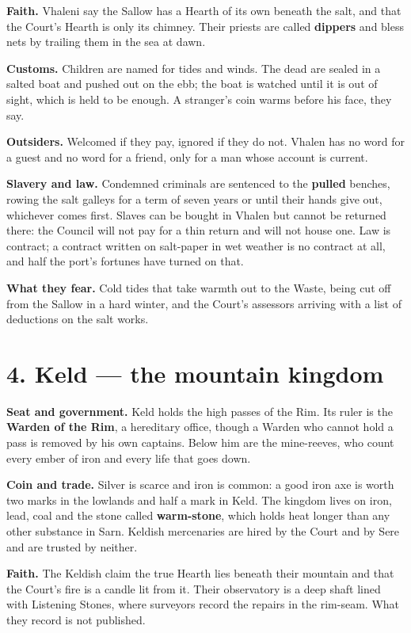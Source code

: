 \documentclass{design/chronicle}
\begin{document}
\textbf{Faith.} Vhaleni say the Sallow has a Hearth of its own beneath the salt, and that the Court’s Hearth is only its chimney. Their priests are called \textbf{dippers} and bless nets by trailing them in the sea at dawn.

\textbf{Customs.} Children are named for tides and winds. The dead are sealed in a salted boat and pushed out on the ebb; the boat is watched until it is out of sight, which is held to be enough. A stranger’s coin warms before his face, they say.

\textbf{Outsiders.} Welcomed if they pay, ignored if they do not. Vhalen has no word for a guest and no word for a friend, only for a man whose account is current.

\textbf{Slavery and law.} Condemned criminals are sentenced to the \textbf{pulled} benches, rowing the salt galleys for a term of seven years or until their hands give out, whichever comes first. Slaves can be bought in Vhalen but cannot be returned there: the Council will not pay for a thin return and will not house one. Law is contract; a contract written on salt-paper in wet weather is no contract at all, and half the port’s fortunes have turned on that.

\textbf{What they fear.} Cold tides that take warmth out to the Waste, being cut off from the Sallow in a hard winter, and the Court’s assessors arriving with a list of deductions on the salt works.

\section*{4. Keld — the mountain kingdom}

\textbf{Seat and government.} Keld holds the high passes of the Rim. Its ruler is the \textbf{Warden of the Rim}, a hereditary office, though a Warden who cannot hold a pass is removed by his own captains. Below him are the mine-reeves, who count every ember of iron and every life that goes down.

\textbf{Coin and trade.} Silver is scarce and iron is common: a good iron axe is worth two marks in the lowlands and half a mark in Keld. The kingdom lives on iron, lead, coal and the stone called \textbf{warm-stone}, which holds heat longer than any other substance in Sarn. Keldish mercenaries are hired by the Court and by Sere and are trusted by neither.

\textbf{Faith.} The Keldish claim the true Hearth lies beneath their mountain and that the Court’s fire is a candle lit from it. Their observatory is a deep shaft lined with Listening Stones, where surveyors record the repairs in the rim-seam. What they record is not published.
\end{document}
